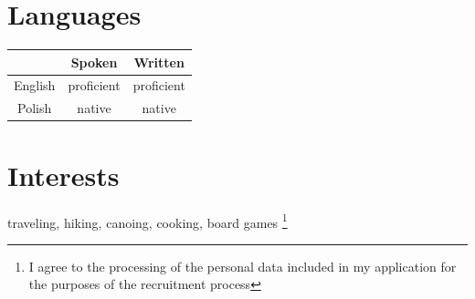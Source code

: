 \documentclass{report}
\begin{document}
\section{Languages}
\begin{tabular}{ccc}
	&Spoken &Written\\
	\hline	 
	English &proficient &proficient\\
	Polish &native &native\\
\end{tabular}

\section{Interests}
traveling,  hiking, canoing, cooking, board games
\footnote{I agree to the processing of the personal data included in my application for the purposes of the recruitment process}
\end{document}

